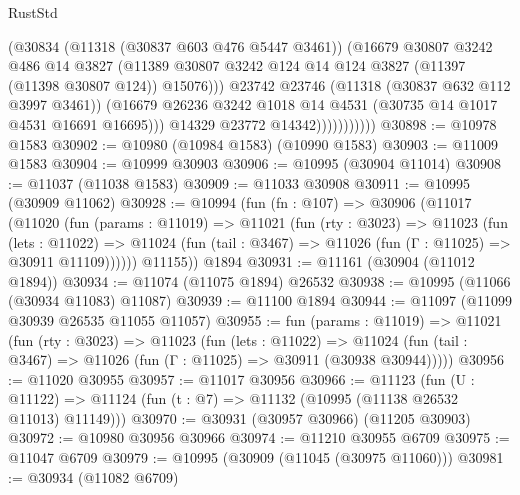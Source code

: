 \begin{lexlean}{RustStd}
\begin{coremodule}
                            (@30834
                              (@11318 (@30837 @603 @476 @5447 @3461))
                              (@16679
                                @30807
                                @3242
                                @486
                                @14
                                @3827
                                (@11389
                                  @30807
                                  @3242
                                  @124
                                  @14
                                  @124
                                  @3827
                                  (@11397 (@11398 @30807 @124))
                                  @15076)))
                            @23742
                            @23746
                            (@11318 (@30837 @632 @112 @3997 @3461))
                            (@16679
                              @26236
                              @3242
                              @1018
                              @14
                              @4531
                              (@30735 @14 @1017 @4531 @16691 @16695)))
                          @14329
                          @23772
                          @14342)))))))))))
@30898 := @10978 @1583
@30902 := @10980 (@10984 @1583) (@10990 @1583)
@30903 := @11009 @1583
@30904 := @10999 @30903
@30906 := @10995 (@30904 @11014)
@30908 := @11037 (@11038 @1583)
@30909 := @11033 @30908
@30911 := @10995 (@30909 @11062)
@30928 := @10994
    (fun (fn : @107) =>
    @30906
      (@11017
        (@11020
          (fun (params : @11019) =>
          @11021
            (fun (rty : @3023) =>
            @11023
              (fun (lets : @11022) =>
              @11024 (fun (tail : @3467) => @11026 (fun (Γ : @11025) => @30911 @11109))))))
        @11155))
    @1894
@30931 := @11161 (@30904 (@11012 @1894))
@30934 := @11074 (@11075 @1894) @26532
@30938 := @10995 (@11066 (@30934 @11083) @11087)
@30939 := @11100 @1894
@30944 := @11097 (@11099 @30939 @26535 @11055 @11057)
@30955 := fun (params : @11019) =>
  @11021
    (fun (rty : @3023) =>
    @11023
      (fun (lets : @11022) =>
      @11024 (fun (tail : @3467) => @11026 (fun (Γ : @11025) => @30911 (@30938 @30944)))))
@30956 := @11020 @30955
@30957 := @11017 @30956
@30966 := @11123
    (fun (U : @11122) => @11124 (fun (t : @7) => @11132 (@10995 (@11138 @26532 @11013) @11149)))
@30970 := @30931 (@30957 @30966) (@11205 @30903)
@30972 := @10980 @30956 @30966
@30974 := @11210 @30955 @6709
@30975 := @11047 @6709
@30979 := @10995 (@30909 (@11045 (@30975 @11060)))
@30981 := @30934 (@11082 @6709)

\end{coremodule}
\end{lexlean}
